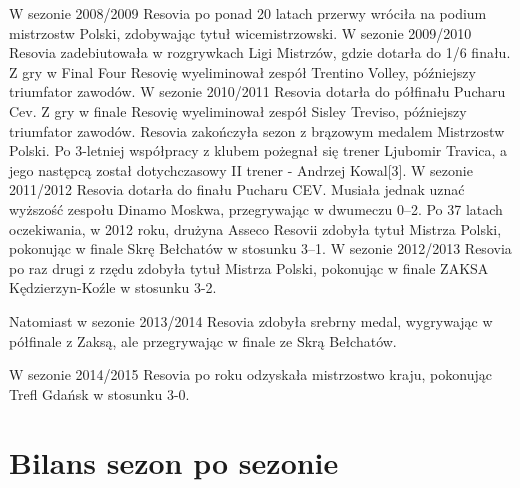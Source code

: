 \documentclass{article}
\begin{document}
W sezonie 2008/2009 Resovia po ponad 20 latach przerwy wróciła na podium mistrzostw Polski, zdobywając tytuł wicemistrzowski.
W sezonie 2009/2010 Resovia zadebiutowała w rozgrywkach Ligi Mistrzów, gdzie dotarła do 1/6 finału. Z gry w Final Four Resovię wyeliminował zespół Trentino Volley, późniejszy triumfator zawodów.
W sezonie 2010/2011 Resovia dotarła do półfinału Pucharu Cev. Z gry w finale Resovię wyeliminował zespół Sisley Treviso, późniejszy triumfator zawodów. Resovia zakończyła sezon z brązowym medalem Mistrzostw Polski. Po 3-letniej współpracy z klubem pożegnał się trener Ljubomir Travica, a jego następcą został dotychczasowy II trener - Andrzej Kowal[3].
W sezonie 2011/2012 Resovia dotarła do finału Pucharu CEV. Musiała jednak uznać wyższość zespołu Dinamo Moskwa, przegrywając w dwumeczu 0–2. Po 37 latach oczekiwania, w 2012 roku, drużyna Asseco Resovii zdobyła tytuł Mistrza Polski, pokonując w finale Skrę Bełchatów w stosunku 3–1.
W sezonie 2012/2013 Resovia po raz drugi z rzędu zdobyła tytuł Mistrza Polski, pokonując w finale ZAKSA Kędzierzyn-Koźle w stosunku 3-2.

Natomiast w sezonie 2013/2014 Resovia zdobyła srebrny medal, wygrywając w półfinale z Zaksą, ale przegrywając w finale ze Skrą Bełchatów.

W sezonie 2014/2015 Resovia po roku odzyskała mistrzostwo kraju, pokonując Trefl Gdańsk w stosunku 3-0.
\section{Bilans sezon po sezonie}
\end{document}
